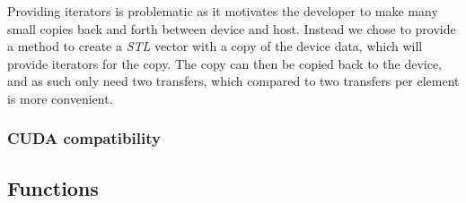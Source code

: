 Providing iterators is problematic as it motivates the developer to make many small copies back and forth between device and host. Instead we chose to provide a method to create a \textit{STL} vector with a copy of the device data, which will provide iterators for the copy. The copy can then be copied back to the device, and as such only need two transfers, which compared to two transfers per element is more convenient.

\subsubsection{CUDA compatibility}

\subsection{Functions}
